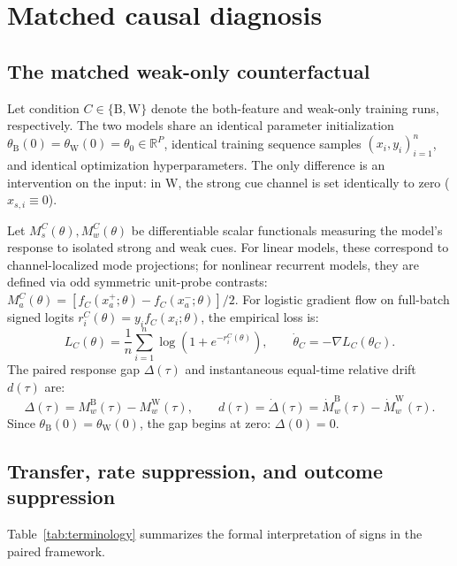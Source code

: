 \documentclass{article}
\theoremstyle{definition}
\theoremstyle{remark}
\newcommand{\R}{\mathbb{R}}
\newcommand{\Bcond}{\mathrm{B}}
\newcommand{\Wcond}{\mathrm{W}}
\begin{document}
\section{Matched causal diagnosis}
\subsection{The matched weak-only counterfactual}
Let condition $C \in \{\Bcond, \Wcond\}$ denote the both-feature and weak-only training runs, respectively. The two models share an identical parameter initialization $\theta_{\Bcond}(0) = \theta_{\Wcond}(0) = \theta_0 \in \R^P$, identical training sequence samples $(x_i, y_i)_{i=1}^n$, and identical optimization hyperparameters. The only difference is an intervention on the input: in $\Wcond$, the strong cue channel is set identically to zero ($x_{s,i} \equiv 0$).

Let $M_s^C(\theta), M_w^C(\theta)$ be differentiable scalar functionals measuring the model's response to isolated strong and weak cues. For linear models, these correspond to channel-localized mode projections; for nonlinear recurrent models, they are defined via odd symmetric unit-probe contrasts: $M_a^C(\theta) = [f_C(x_a^+; \theta) - f_C(x_a^-; \theta)] / 2$.
For logistic gradient flow on full-batch signed logits $r_i^C(\theta) = y_i f_C(x_i; \theta)$, the empirical loss is:
\begin{equation}
  L_C(\theta) = \frac{1}{n} \sum_{i=1}^n \log\left(1 + e^{-r_i^C(\theta)}\right), \qquad \dot{\theta}_C = -\nabla L_C(\theta_C).
  \label{eq:logistic-flow}
\end{equation}
The paired response gap $\Delta(\tau)$ and instantaneous equal-time relative drift $d(\tau)$ are:
\begin{equation}
  \Delta(\tau) = M_w^{\Bcond}(\tau) - M_w^{\Wcond}(\tau), \qquad d(\tau) = \dot{\Delta}(\tau) = \dot{M}_w^{\Bcond}(\tau) - \dot{M}_w^{\Wcond}(\tau).
  \label{eq:paired-gap}
\end{equation}
Since $\theta_{\Bcond}(0) = \theta_{\Wcond}(0)$, the gap begins at zero: $\Delta(0) = 0$.

\subsection{Transfer, rate suppression, and outcome suppression}
Table~\ref{tab:terminology} summarizes the formal interpretation of signs in the paired framework.
\end{document}
